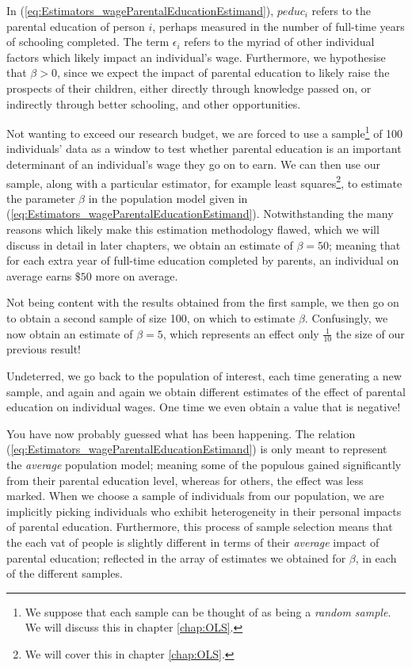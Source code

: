 \documentclass[11pt,fullpage]{book}
\begin{document}
In (\ref{eq:Estimators_wageParentalEducationEstimand}), $peduc_i$ refers to the parental education of person $i$, perhaps measured in the number of full-time years of schooling completed. The term $\epsilon_i$ refers to the myriad of other individual factors which likely impact an individual's wage. Furthermore, we hypothesise that $\beta>0$, since we expect the impact of parental education to likely raise the prospects of their children, either directly through knowledge passed on, or indirectly through better schooling, and other opportunities. 

Not wanting to exceed our research budget, we are forced to use a sample\footnote{We suppose that each sample can be thought of as being a \textit{random sample}. We will discuss this in chapter \ref{chap:OLS}.} of 100 individuals' data as a window to test whether parental education is an important determinant of an individual's wage they go on to earn. We can then use our sample, along with a particular estimator, for example least squares\footnote{We will cover this in chapter \ref{chap:OLS}.}, to estimate the parameter $\beta$ in the population model given in (\ref{eq:Estimators_wageParentalEducationEstimand}). Notwithstanding the many reasons which likely make this estimation methodology flawed, which we will discuss in detail in later chapters, we obtain an estimate of $\beta=50$; meaning that for each extra year of full-time education completed by parents, an individual on average earns $\$50$ more on average.

Not being content with the results obtained from the first sample, we then go on to obtain a second sample of size 100, on which to estimate $\beta$. Confusingly, we now obtain an estimate of $\beta=5$, which represents an effect only $\frac{1}{10}$ the size of our previous result! 

Undeterred, we go back to the population of interest, each time generating a new sample, and again and again we obtain different estimates of the effect of parental education on individual wages. One time we even obtain a value that is negative! 

You have now probably guessed what has been happening. The relation (\ref{eq:Estimators_wageParentalEducationEstimand}) is only meant to represent the \textit{average} population model; meaning some of the populous gained significantly from their parental education level, whereas for others, the effect was less marked. When we choose a sample of individuals from our population, we are implicitly picking individuals who exhibit heterogeneity in their personal impacts of parental education. Furthermore, this process of sample selection means that the each vat of people is slightly different in terms of their \textit{average} impact of parental education; reflected in the array of estimates we obtained for $\beta$, in each of the different samples.
\end{document}

